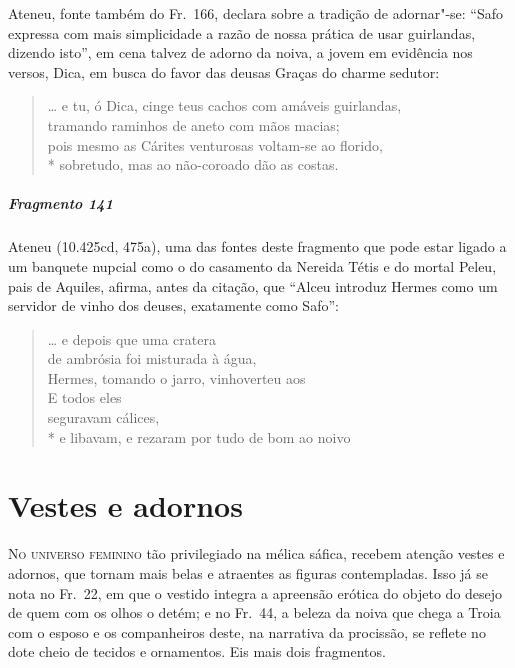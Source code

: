 {\small Ateneu, fonte também do Fr.~166, declara sobre a tradição de adornar"-se:
``Safo expressa com mais simplicidade a razão de nossa prática
de usar guirlandas, dizendo isto”, em cena talvez de adorno da noiva, a jovem em evidência nos versos, Dica, em busca do favor das deusas Graças do charme sedutor:}

\begin{verse}
\ldots{} e tu, ó Dica, cinge teus cachos com amáveis guirlandas,\\
tramando raminhos de aneto com mãos macias;\\
pois mesmo as Cárites venturosas voltam-se ao florido,\\*
sobretudo, mas ao não-coroado dão as costas.
\end{verse}

\paragraph{Fragmento 141}

{\small Ateneu (10.425cd, 475a), uma das fontes deste fragmento que pode estar ligado a um banquete
nupcial como o do casamento da Nereida Tétis e do mortal Peleu, pais de Aquiles,
afirma, antes da citação, que ``Alceu introduz Hermes como um servidor de vinho dos
deuses, exatamente como Safo'':}

\begin{verse}
\ldots{} e depois que uma cratera\\
de ambrósia foi misturada à água,\\
Hermes, tomando o jarro, vinhoverteu aos \\
E todos eles\\
seguravam cálices,\\*
e libavam, e rezaram por tudo de bom ao noivo
\end{verse}

\chapter{Vestes e adornos}

\textsc{No universo feminino} tão privilegiado na mélica sáfica, recebem atenção vestes e
adornos, que tornam mais belas e atraentes as figuras contempladas. Isso já se
nota no Fr.~22, em que o vestido integra a apreensão erótica do objeto do
desejo de quem com os olhos o detém; e no Fr.~44, a beleza da noiva que chega a
Troia com o esposo e os companheiros deste, na narrativa da procissão, se
reflete no dote cheio de tecidos e ornamentos. Eis mais dois fragmentos.


